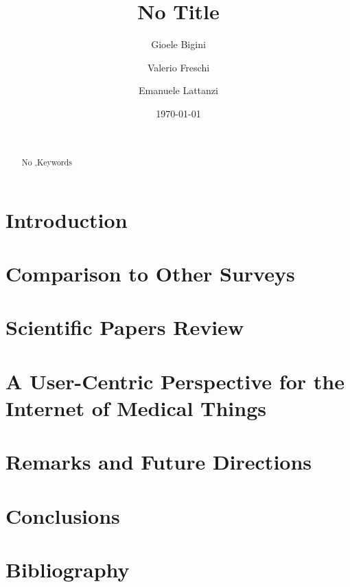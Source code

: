 \documentclass[preprint]{elsarticle}
\begin{document}
\title{No Title}

\author[1]{Gioele Bigini}%
\author[1]{Valerio Freschi}%
\author[1]{Emanuele Lattanzi}%


\address[1]{Department of Pure and Applied Sciences, University of Urbino\\Piazza della Repubblica 13, 61029 Urbino, Italy}

\begin{abstract}
\\

	\begin{keyword}
	No \sep Keywords
    \end{keyword}
\end{abstract}

\date{\today}
\maketitle

\section{Introduction}

\section{Comparison to Other Surveys}


\section{Scientific Papers Review}

\section{A User-Centric Perspective for the Internet of Medical Things}

\section{Remarks and Future Directions}

\section{Conclusions}

\section*{Bibliography}


\end{document}
